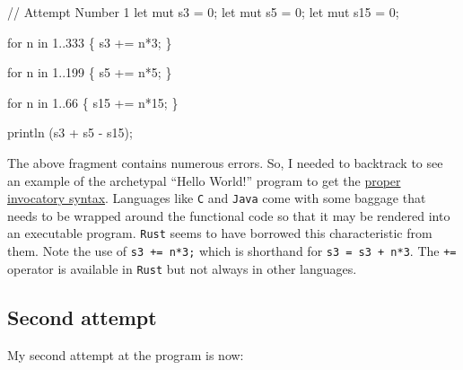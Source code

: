 \documentclass[
  a4paper,
]{article}
\newenvironment{Shaded}{\begin{snugshade}}{\end{snugshade}}
\newcommand{\CommentTok}[1]{\textcolor[rgb]{0.50,0.62,0.50}{#1}}
\newcommand{\ControlFlowTok}[1]{\textcolor[rgb]{0.94,0.87,0.69}{#1}}
\newcommand{\DecValTok}[1]{\textcolor[rgb]{0.86,0.86,0.80}{#1}}
\newcommand{\KeywordTok}[1]{\textcolor[rgb]{0.94,0.87,0.69}{#1}}
\newcommand{\NormalTok}[1]{\textcolor[rgb]{0.80,0.80,0.80}{#1}}
\newcommand{\OperatorTok}[1]{\textcolor[rgb]{0.94,0.94,0.82}{#1}}
\begin{document}
\begin{Shaded}
\begin{Highlighting}[]
\CommentTok{// Attempt Number 1}
  \KeywordTok{let} \KeywordTok{mut}\NormalTok{ s3 }\OperatorTok{=} \DecValTok{0}\OperatorTok{;}
  \KeywordTok{let} \KeywordTok{mut}\NormalTok{ s5 }\OperatorTok{=} \DecValTok{0}\OperatorTok{;}
  \KeywordTok{let} \KeywordTok{mut}\NormalTok{ s15 }\OperatorTok{=} \DecValTok{0}\OperatorTok{;}

  \ControlFlowTok{for}\NormalTok{ n }\KeywordTok{in} \DecValTok{1}\OperatorTok{..}\DecValTok{333} \OperatorTok{\{}
\NormalTok{    s3 }\OperatorTok{+=}\NormalTok{ n}\OperatorTok{*}\DecValTok{3}\OperatorTok{;}
  \OperatorTok{\}}

  \ControlFlowTok{for}\NormalTok{ n }\KeywordTok{in} \DecValTok{1}\OperatorTok{..}\DecValTok{199} \OperatorTok{\{}
\NormalTok{    s5 }\OperatorTok{+=}\NormalTok{ n}\OperatorTok{*}\DecValTok{5}\OperatorTok{;}
  \OperatorTok{\}}

  \ControlFlowTok{for}\NormalTok{ n }\KeywordTok{in} \DecValTok{1}\OperatorTok{..}\DecValTok{66} \OperatorTok{\{}
\NormalTok{    s15 }\OperatorTok{+=}\NormalTok{ n}\OperatorTok{*}\DecValTok{15}\OperatorTok{;}
  \OperatorTok{\}}

\NormalTok{  println (s3 }\OperatorTok{+}\NormalTok{ s5 }\OperatorTok{{-}}\NormalTok{ s15)}\OperatorTok{;}
\end{Highlighting}
\end{Shaded}

The above fragment contains numerous errors. So, I needed to backtrack
to see an example of the archetypal ``Hello World!'' program to get the
\href{https://doc.rust-lang.org/book/ch01-02-hello-world.html}{proper
invocatory syntax}. Languages like \texttt{C} and \texttt{Java} come
with some baggage that needs to be wrapped around the functional code so
that it may be rendered into an executable program. \texttt{Rust} seems
to have borrowed this characteristic from them. Note the use of
\texttt{s3\ +=\ n*3;} which is shorthand for \texttt{s3\ =\ s3\ +\ n*3}.
The \texttt{+=} operator is available in \texttt{Rust} but not always in
other languages.

\hypertarget{second-attempt}{%
\subsection{Second attempt}\label{second-attempt}}

My second attempt at the program is now:
\end{document}

